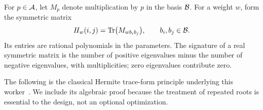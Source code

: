 For $p\in\mathcal A$, let $M_p$ denote multiplication by $p$ in the basis $\mathcal B$. For a weight $w$, form the symmetric matrix
\begin{equation}\label{eq:hermite}
H_w(i,j)=\operatorname{Tr}\bigl(M_{w b_i b_j}\bigr),\qquad b_i,b_j\in\mathcal B.
\end{equation}
Its entries are rational polynomials in the parameters. The signature of a real symmetric matrix is the number of positive eigenvalues minus the number of negative eigenvalues, with multiplicities; zero eigenvalues contribute zero.

The following is the classical Hermite trace-form principle underlying this worker~\cite{le-safey,gaillard-safey}. We include its algebraic proof because the treatment of repeated roots is essential to the design, not an optional optimization.

